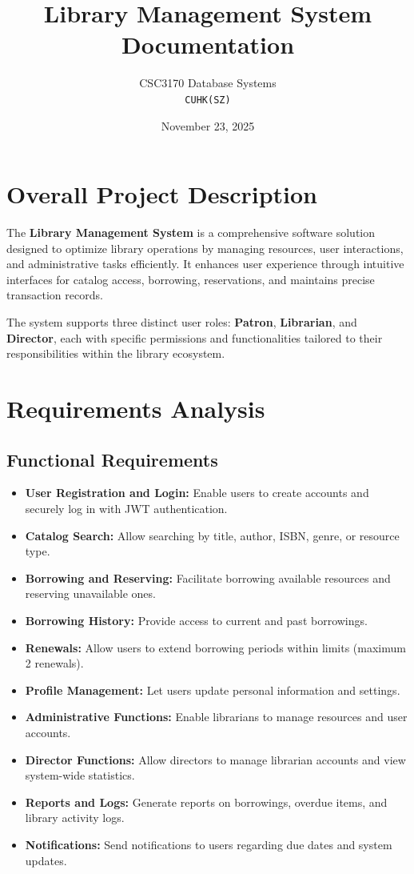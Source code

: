 \documentclass[11pt,a4paper]{article}
\title{Library Management System Documentation}
\author{CSC3170 Database Systems\\
\texttt{CUHK(SZ)}}
\date{November 23, 2025}
\begin{document}
\maketitle

\tableofcontents
\newpage

\section{Overall Project Description}

The \textbf{Library Management System} is a comprehensive software solution designed to optimize library operations by managing resources, user interactions, and administrative tasks efficiently. It enhances user experience through intuitive interfaces for catalog access, borrowing, reservations, and maintains precise transaction records.

The system supports three distinct user roles: \textbf{Patron}, \textbf{Librarian}, and \textbf{Director}, each with specific permissions and functionalities tailored to their responsibilities within the library ecosystem.

\section{Requirements Analysis}

\subsection{Functional Requirements}

\begin{itemize}
    \item \textbf{User Registration and Login:} Enable users to create accounts and securely log in with JWT authentication.
    \item \textbf{Catalog Search:} Allow searching by title, author, ISBN, genre, or resource type.
    \item \textbf{Borrowing and Reserving:} Facilitate borrowing available resources and reserving unavailable ones.
    \item \textbf{Borrowing History:} Provide access to current and past borrowings.
    \item \textbf{Renewals:} Allow users to extend borrowing periods within limits (maximum 2 renewals).
    \item \textbf{Profile Management:} Let users update personal information and settings.
    \item \textbf{Administrative Functions:} Enable librarians to manage resources and user accounts.
    \item \textbf{Director Functions:} Allow directors to manage librarian accounts and view system-wide statistics.
    \item \textbf{Reports and Logs:} Generate reports on borrowings, overdue items, and library activity logs.
    \item \textbf{Notifications:} Send notifications to users regarding due dates and system updates.
\end{itemize}
\end{document}
